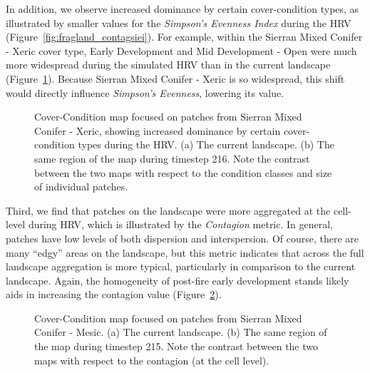 In addition, we observe increased dominance by certain cover-condition types, as illustrated by smaller values for the \emph{Simpson's Evenness Index} during the HRV (Figure~\ref{fig:fragland_contagsiei}). For example, within the Sierran Mixed Conifer - Xeric cover type, Early Development and Mid Development - Open were much more widespread during the simulated HRV than in the current landscape (Figure~\ref{fig:patchmaps2}). Because Sierran Mixed Conifer - Xeric is so widespread, this shift would directly influence \emph{Simpson's Evenness}, lowering its value.
\begin{figure}[!htbp]
  \centering
  \caption{Cover-Condition map focused on patches from Sierran Mixed Conifer - Xeric, showing increased dominance by certain cover-condition types during the HRV. (a) The current landscape. (b) The same region of the map during timestep 216. Note the contrast between the two maps with respect to the condition classes and size of individual patches.} %
  \label{fig:patchmaps2}
\end{figure}


Third, we find that patches on the landscape were more aggregated at the cell-level during HRV, which is illustrated by the \emph{Contagion} metric. In general, patches have low levels of both dispersion and interspersion. Of course, there are many ``edgy'' areas on the landscape, but this metric indicates that across the full landscape aggregation is more typical, particularly in comparison to the current landscape. Again, the homogeneity of post-fire early development stands likely aids in increasing the contagion value (Figure~\ref{fig:patchmaps3}). 
\begin{figure}[!htbp]
  \centering
  \caption{Cover-Condition map focused on patches from Sierran Mixed Conifer - Mesic. (a) The current landscape. (b) The same region of the map during timestep 215. Note the contrast between the two maps with respect to the contagion (at the cell level).} 
  \label{fig:patchmaps3} %
\end{figure}

